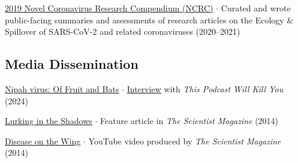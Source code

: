 \documentclass{cv}
\begin{document}
\href{https://ncrc.jhsph.edu/}{2019 Novel Coronavirus Research Compendium (NCRC)} $\cdot$ Curated and wrote public-facing summaries and assessments of research articles on the Ecology \& Spillover of SARS-CoV-2 and related coronaviruses (2020--2021)

\subsection*{Media Dissemination}



\href{https://thispodcastwillkillyou.com/2024/05/21/episode-140-nipah-virus-of-fruit-and-bats/}{Nipah virus: Of Fruit and Bats} $\cdot$ \href{https://open.spotify.com/episode/3bF2bICaa7Ipq7s6EzCUKj?si=456f659ff8874de5}{Interview} with \textit{This Podcast Will Kill You} (2024)

\href{https://www.the-scientist.com/features/lurking-in-the-shadows-36302}{Lurking in the Shadows} $\cdot$ Feature article in \textit{The Scientist Magazine} (2014)

\href{https://youtu.be/p6I0kRVGyo4}{Disease on the Wing} $\cdot$ YouTube video produced by \textit{The Scientist Magazine} (2014)




\end{document}
